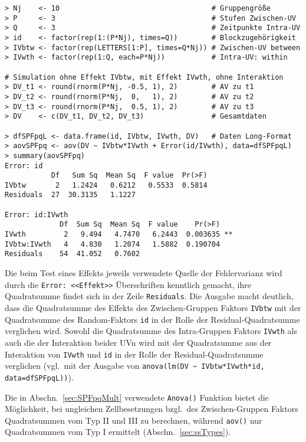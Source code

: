 \begin{lstlisting}
> Nj    <- 10                                    # Gruppengröße
> P     <- 3                                     # Stufen Zwischen-UV
> Q     <- 3                                     # Zeitpunkte Intra-UV
> id    <- factor(rep(1:(P*Nj), times=Q))        # Blockzugehörigkeit
> IVbtw <- factor(rep(LETTERS[1:P], times=Q*Nj)) # Zwischen-UV between
> IVwth <- factor(rep(1:Q, each=P*Nj))           # Intra-UV: within

# Simulation ohne Effekt IVbtw, mit Effekt IVwth, ohne Interaktion
> DV_t1 <- round(rnorm(P*Nj, -0.5, 1), 2)        # AV zu t1
> DV_t2 <- round(rnorm(P*Nj,  0,   1), 2)        # AV zu t2
> DV_t3 <- round(rnorm(P*Nj,  0.5, 1), 2)        # AV zu t3
> DV    <- c(DV_t1, DV_t2, DV_t3)                # Gesamtdaten

> dfSPFpqL <- data.frame(id, IVbtw, IVwth, DV)   # Daten Long-Format
> aovSPFpq <- aov(DV ~ IVbtw*IVwth + Error(id/IVwth), data=dfSPFpqL)
> summary(aovSPFpq)
Error: id
           Df   Sum Sq  Mean Sq  F value  Pr(>F)
IVbtw       2   1.2424   0.6212   0.5533  0.5814
Residuals  27  30.3135   1.1227

Error: id:IVwth
             Df  Sum Sq  Mean Sq  F value    Pr(>F)
IVwth         2   9.494   4.7470   6.2443  0.003635 **
IVbtw:IVwth   4   4.830   1.2074   1.5882  0.190704
Residuals    54  41.052   0.7602
\end{lstlisting}

Die beim Test eines Effekts jeweils verwendete Quelle der Fehlervarianz wird durch die \lstinline!Error: <<Effekt>>! Überschriften kenntlich gemacht, ihre Quadratsumme findet sich in der Zeile \lstinline!Residuals!. Die Ausgabe macht deutlich, dass die Quadratsumme des Effekts des Zwischen-Gruppen Faktors \lstinline!IVbtw! mit der Quadratsumme des Random-Faktors \lstinline!id! in der Rolle der Residual-Quadratsumme verglichen wird. Sowohl die Quadratsumme des Intra-Gruppen Faktors \lstinline!IVwth! als auch die der Interaktion beider UVn wird mit der Quadratsumme aus der Interaktion von \lstinline!IVwth! und \lstinline!id! in der Rolle der Residual-Quadratsumme verglichen (vgl.\ mit der Ausgabe von \lstinline!anova(lm(DV ~ IVbtw*IVwth*id, data=dfSPFpqL))!).

Die in Abschn.\ \ref{sec:SPFpqMult} verwendete \lstinline!Anova()! Funktion bietet die Möglichkeit, bei ungleichen Zellbesetzungen bzgl.\ des Zwischen-Gruppen Faktors Quadratsummen vom Typ II und III zu berechnen, während \lstinline!aov()! nur Quadratsummen vom Typ I ermittelt (Abschn.\ \ref{sec:ssTypes}).

